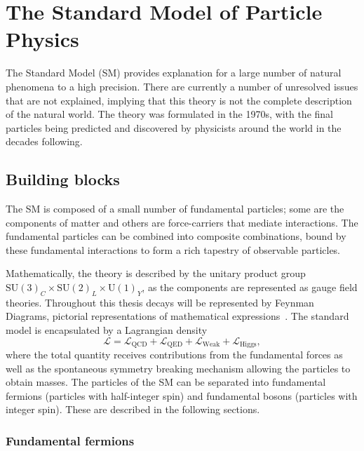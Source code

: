 \section{The Standard Model of Particle Physics}

The Standard Model (SM) provides explanation for a large number of natural phenomena to a high precision. There are currently a number of unresolved issues that are not explained, implying that this theory is not the complete description of the natural world. The theory was formulated in the 1970s, with the final particles being predicted and discovered by physicists around the world in the decades following.

\subsection{Building blocks}

The SM is composed of a small number of fundamental particles; some are the components of matter and others are force-carriers that mediate interactions. The fundamental particles can be combined into composite combinations, bound by these fundamental interactions to form a rich tapestry of observable particles.

Mathematically, the theory is described by the unitary product group $\text{SU}(3)_{C}\times\text{SU}(2)_{L}\times\text{U}(1)_{Y}$, as the components are represented as gauge field theories. Throughout this thesis decays will be represented by Feynman Diagrams, pictorial representations of mathematical expressions~\cite{PhysRev.76.749}.  
The standard model is encapsulated by a Lagrangian density
\begin{equation}
\mathcal{L} = \mathcal{L}_{\text{QCD}}+\mathcal{L}_{\text{QED}}+\mathcal{L}_{\text{Weak}}+\mathcal{L}_{\text{Higgs}},
\end{equation}
where the total quantity receives contributions from the fundamental forces as well as the spontaneous symmetry breaking mechanism allowing the particles to obtain masses. 
The particles of the SM can be separated into fundamental fermions (particles with half-integer spin) and fundamental bosons (particles with integer spin). These are described in the following sections.  


\subsubsection{Fundamental fermions}

